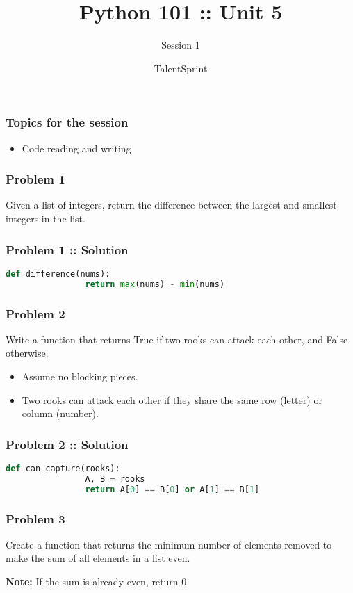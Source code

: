 \documentclass[14pt]{beamer}
\title{Python 101 :: Unit 5}
\subtitle{Session 1}
\date{}
\author[TS]{TalentSprint}
\begin{document}
    \begin{frame}
        \titlepage
    \end{frame}
    \begin{frame}
        \frametitle{Topics for the session}
        \begin{itemize}
            \item Code reading and writing
        \end{itemize}
    \end{frame}
    \begin{frame}
        \frametitle{Problem 1}
        \alert{Given a list of integers, return the difference between the largest and smallest integers in the list.}
    \end{frame}
    \begin{frame}[containsverbatim]
        \frametitle{Problem 1 :: Solution}
        \begin{lstlisting}[language=Python]
            def difference(nums):
                return max(nums) - min(nums)
        \end{lstlisting}
    \end{frame}
    \begin{frame}
        \frametitle{Problem 2}
        \alert{Write a function that returns True if two rooks can attack each other, and False otherwise.}

        \begin{itemize}
            \item Assume no blocking pieces.
            \item Two rooks can attack each other if they share the same row (letter) or column (number).
        \end{itemize}
    \end{frame}

    \begin{frame}[containsverbatim]
        \frametitle{Problem 2 :: Solution}
        \begin{lstlisting}[language=Python]
            def can_capture(rooks):
                A, B = rooks
                return A[0] == B[0] or A[1] == B[1]
        \end{lstlisting}
    \end{frame}

    \begin{frame}
        \frametitle{Problem 3}
        \alert{Create a function that returns the minimum number of elements removed to make the sum of all elements in a list even.}
        
        \textbf{Note:} If the sum is already even, return 0
    \end{frame}
\end{document}
